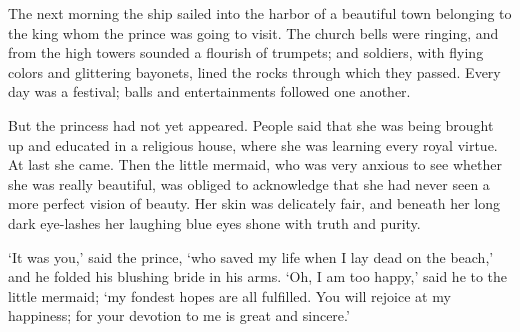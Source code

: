 The next morning the ship sailed into the harbor of a beautiful
town belonging to the king whom the prince was going to visit. 
The
church bells were ringing, and from the high towers sounded a flourish
of trumpets; and soldiers, with flying colors and glittering bayonets,
lined the rocks through which they passed. 
Every day was a festival;
balls and entertainments followed one another.

But the princess had not yet appeared. 
People said that she was
being brought up and educated in a religious house, where she was
learning every royal virtue. 
At last she came. 
Then the little
mermaid, who was very anxious to see whether she was really beautiful,
was obliged to acknowledge that she had never seen a more perfect
vision of beauty. 
Her skin was delicately fair, and beneath her long
dark eye-lashes her laughing blue eyes shone with truth and purity.

`It was you,' said the prince, `who saved my life when I lay
dead on the beach,' and he folded his blushing bride in his arms. 
`Oh,
I am too happy,' said he to the little mermaid; `my fondest hopes
are all fulfilled. 
You will rejoice at my happiness; for your devotion
to me is great and sincere.'

